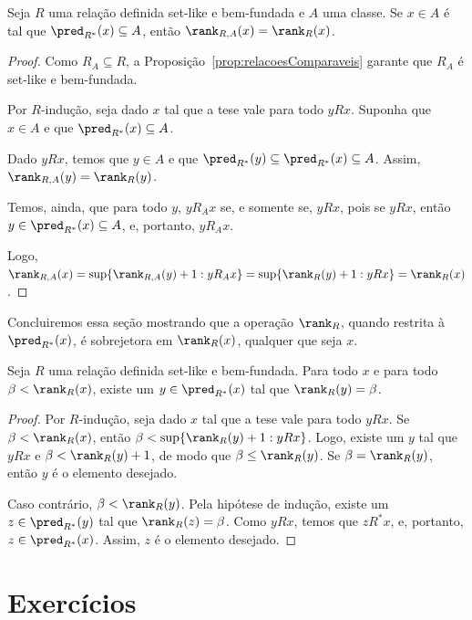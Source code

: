 \begin{proposition}[$\ZFmP$]\label{prop:rankRestricao}
    Seja $R$ uma relação definida set-like e bem-fundada e $A$ uma classe.
    Se $x\in A$ é tal que $\pred_{R^*}(x)\subseteq A$, então $\rank_{R,A}(x)=\rank_R(x)$.
\end{proposition}
\begin{proof}
    Como $R_A\subseteq R$, a Proposição~\ref{prop:relacoesComparaveis} garante que $R_A$ é set-like e bem-fundada.

    Por $R$-indução, seja dado $x$ tal que a tese vale para todo $y R x$.
    Suponha que $x \in A$ e que $\pred_{R^*}(x)\subseteq A$.

    Dado $y R x$, temos que $y\in A$ e que $\pred_{R^*}(y)\subseteq \pred_{R^*}(x)\subseteq A$.
    Assim, $\rank_{R,A}(y)=\rank_R(y)$.

    Temos, ainda, que para todo $y$, $y R_A x$ se, e somente se, $y R x$, pois se $y R x$, então $y\in \pred_{R^*}(x)\subseteq A$, e, portanto, $y R_A x$.

    Logo, $\rank_{R,A}(x)=\sup\{\rank_{R,A}(y)+1: y R_A x\}=\sup\{\rank_R(y)+1: y R x\}=\rank_R(x)$.
\end{proof}

Concluiremos essa seção mostrando que a operação $\rank_R$, quando restrita à $\pred_{R^*}(x)$, é sobrejetora em $\rank_R(x)$, qualquer que seja $x$.

\begin{proposition}[$\ZFmP$]\label{prop:rankSobrejetora}
    Seja $R$ uma relação definida set-like e bem-fundada.
    Para todo $x$ e para todo $\beta<\rank_R(x)$, existe um $y\in \pred_{R^*}(x)$ tal que $\rank_R(y)=\beta$.
\end{proposition}
\begin{proof}
    Por $R$-indução, seja dado $x$ tal que a tese vale para todo $y R x$.
    Se $\beta<\rank_R(x)$, então $\beta<\sup\{\rank_R(y)+1: y R x\}$.
    Logo, existe um $y$ tal que $y R x$ e $\beta<\rank_R(y)+1$, de modo que $\beta\leq \rank_R(y)$.
    Se $\beta=\rank_R(y)$, então $y$ é o elemento desejado.

    Caso contrário, $\beta<\rank_R(y)$.
    Pela hipótese de indução, existe um $z\in \pred_{R^*}(y)$ tal que $\rank_R(z)=\beta$.
    Como $y R x$, temos que $z R^* x$, e, portanto, $z\in \pred_{R^*}(x)$.
    Assim, $z$ é o elemento desejado.
\end{proof}
\section*{Exercícios}

